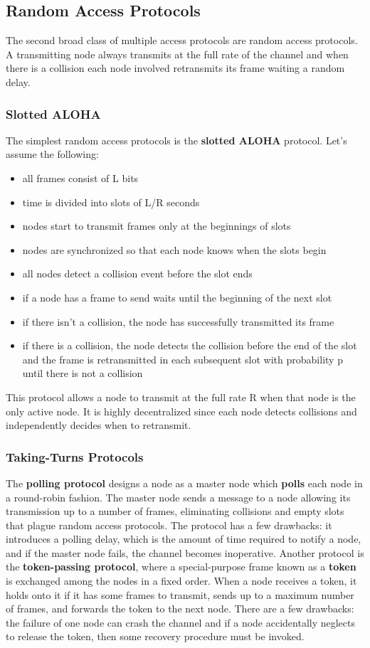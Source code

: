 \documentclass{article}
\begin{document}
\subsection{Random Access Protocols}
The second broad class of multiple access protocols are random access protocols. A transmitting node always transmits at the full rate of the channel and when there is a collision each node involved retransmits its frame waiting a random delay.
\subsubsection*{Slotted ALOHA}
The simplest random access protocols is the \textbf{slotted ALOHA} protocol.
Let's assume the following: 
\begin{itemize}
    \item all frames consist of L bits
    \item time is divided into slots of L/R seconds
    \item nodes start to transmit frames only at the beginnings of slots
    \item nodes are synchronized so that each node knows when the slots begin
    \item all nodes detect a collision event before the slot ends
    \item if a node has a frame to send waits until the beginning of the next slot
    \item if there isn’t a collision, the node has successfully transmitted its frame
    \item if there is a collision, the node detects the collision before the end of the slot and the frame is retransmitted in each subsequent slot with probability p until there is not a collision
\end{itemize}
This protocol allows a node to transmit at the full rate R when that node is the only active node.
It is highly decentralized since each node detects collisions and independently decides when to retransmit.
\subsubsection{Taking-Turns Protocols}
The \textbf{polling protocol} designs a node as a master node which \textbf{polls} each node in a round-robin fashion.
The master node sends a message to a node allowing its transmission up to a number of frames, eliminating collisions and empty slots that plague random access protocols.
The protocol has a few drawbacks: it introduces a polling delay, which is the amount of time required to notify a node, and if the master node fails, the channel becomes inoperative.
Another protocol is the \textbf{token-passing protocol}, where a special-purpose frame known as a \textbf{token} is exchanged among the nodes in a fixed order.
When a node receives a token, it holds onto it if it has some frames to transmit, sends up to a maximum number of frames, and forwards the token to the next node.
There are a few drawbacks: the failure of one node can crash the channel and if a node accidentally neglects to release the token, then some recovery procedure must be invoked.
\end{document}

